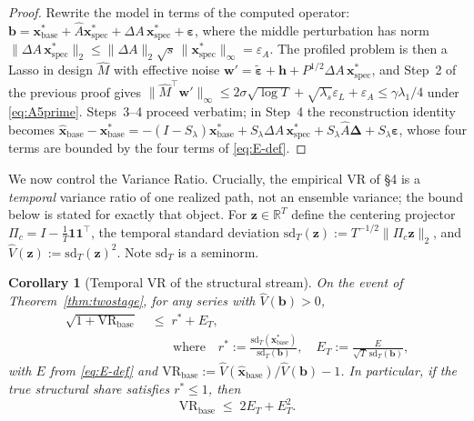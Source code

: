 \documentclass[10pt]{article} %
\theoremstyle{plain}
\newtheorem{corollary}{Corollary}
\theoremstyle{definition}
\begin{document}
\begin{proof}
Rewrite the model in terms of the computed operator:
$\mathbf{b} = \mathbf{x}^{*}_{\mathrm{base}}
+ \hat{A}\mathbf{x}^{*}_{\mathrm{spec}}
+ \Delta A\,\mathbf{x}^{*}_{\mathrm{spec}}
+ \boldsymbol{\varepsilon}$, where the middle perturbation has norm
$\|\Delta A\,\mathbf{x}^{*}_{\mathrm{spec}}\|_{2}
\le \|\Delta A\|_{2}\sqrt{s}\,
\|\mathbf{x}^{*}_{\mathrm{spec}}\|_{\infty} = \varepsilon_{A}$. The
profiled problem is then a Lasso in design $\hat{M}$ with effective
noise $\mathbf{w}' = \tilde{\boldsymbol{\varepsilon}} + \mathbf{h}
+ P^{1/2}\Delta A\,\mathbf{x}^{*}_{\mathrm{spec}}$, and Step~2 of the
previous proof gives
$\|\hat{M}^{\top}\mathbf{w}'\|_{\infty}
\le 2\sigma\sqrt{\log T} + \sqrt{\lambda_{s}}\varepsilon_{L}
+ \varepsilon_{A} \le \gamma\lambda_{1}/4$ under
\eqref{eq:A5prime}. Steps~3--4 proceed verbatim; in Step~4 the
reconstruction identity becomes
$\hat{\mathbf{x}}_{\mathrm{base}}-\mathbf{x}^{*}_{\mathrm{base}}
= -(I-S_{\lambda})\mathbf{x}^{*}_{\mathrm{base}}
+ S_{\lambda}\Delta A\,\mathbf{x}^{*}_{\mathrm{spec}}
+ S_{\lambda}\hat{A}\boldsymbol{\Delta}
+ S_{\lambda}\boldsymbol{\varepsilon}$, whose four terms are bounded
by the four terms of \eqref{eq:E-def}.
\end{proof}

We now control the Variance Ratio. Crucially, the empirical VR of
\S4 is a \emph{temporal} variance ratio of one realized path, not an
ensemble variance; the bound below is stated for exactly that object.
For $\mathbf{z}\in\mathbb{R}^{T}$ define the centering projector
$\Pi_{c}=I-\tfrac{1}{T}\mathbf{1}\mathbf{1}^{\top}$, the temporal
standard deviation
$\mathrm{sd}_{T}(\mathbf{z}) := T^{-1/2}\|\Pi_{c}\mathbf{z}\|_{2}$,
and $\widehat{V}(\mathbf{z}) := \mathrm{sd}_{T}(\mathbf{z})^{2}$.
Note $\mathrm{sd}_{T}$ is a seminorm.

\begin{corollary}[Temporal VR of the structural stream]
\label{cor:vr}
On the event of Theorem~\ref{thm:twostage}, for any series with
$\widehat{V}(\mathbf{b})>0$,
\begin{align}
\sqrt{1+\mathrm{VR}_{\mathrm{base}}}
&\;\le\; r^{*} + E_{T},\nonumber\\
&\qquad\text{where}\quad
r^{*} := \frac{\mathrm{sd}_{T}(\mathbf{x}^{*}_{\mathrm{base}})}
{\mathrm{sd}_{T}(\mathbf{b})},\quad
E_{T} := \frac{E}{\sqrt{T}\,\mathrm{sd}_{T}(\mathbf{b})},
\end{align}
with $E$ from \eqref{eq:E-def} and
$\mathrm{VR}_{\mathrm{base}} :=
\widehat{V}(\hat{\mathbf{x}}_{\mathrm{base}})/\widehat{V}(\mathbf{b})-1$.
In particular, if the true structural share satisfies $r^{*}\le 1$,
then
\begin{equation}
\mathrm{VR}_{\mathrm{base}} \;\le\; 2E_{T} + E_{T}^{2}.
\label{eq:vr-final}
\end{equation}
\end{corollary}
\end{document}
